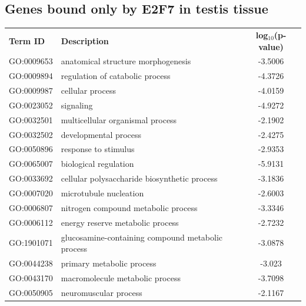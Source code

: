 \documentclass[11pt,twoside,a4paper]{report}
\begin{document}
\begin{appendices}
    \section{Genes bound only by E2F7 in testis tissue}
	\footnotesize  %
	\begin{longtable}{@{\extracolsep{\fill}}llc@{}}
	\textbf{Term ID}  & \textbf{Description}                                 & \textbf{log$_{10}$(p-value)} \\
	GO:0009653 & anatomical structure morphogenesis                          & -3.5006       \\
    GO:0009894 & regulation of catabolic process                             & -4.3726       \\
    GO:0009987 & cellular process                                            & -4.0159       \\
    GO:0023052 & signaling                                                   & -4.9272       \\
    GO:0032501 & multicellular organismal process                            & -2.1902       \\
    GO:0032502 & developmental process                                       & -2.4275       \\
    GO:0050896 & response to stimulus                                        & -2.9353       \\
    GO:0065007 & biological regulation                                       & -5.9131       \\
    GO:0033692 & cellular polysaccharide biosynthetic process                & -3.1836       \\
    GO:0007020 & microtubule nucleation                                      & -2.6003       \\
    GO:0006807 & nitrogen compound metabolic process                         & -3.3346       \\
    GO:0006112 & energy reserve metabolic process                            & -2.7232       \\
    GO:1901071 & glucosamine-containing compound metabolic process           & -3.0878       \\
    GO:0044238 & primary metabolic process                                   & -3.023        \\
    GO:0043170 & macromolecule metabolic process                             & -3.7098       \\
    GO:0050905 & neuromuscular process                                       & -2.1167       \\

\end{longtable}
\end{appendices}
\end{document}
